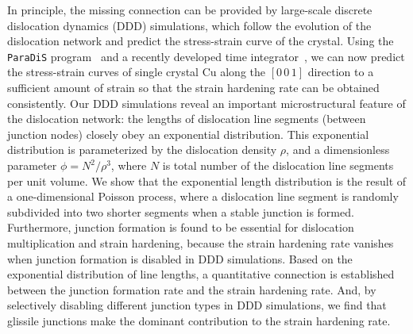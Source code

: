 \documentclass[%
reprint,
 amsmath,amssymb,
 aps,
superscriptaddress,
]{revtex4-1}
\begin{document}
In principle, the missing connection can be provided by large-scale discrete
dislocation dynamics (DDD) simulations, which follow the evolution of the
dislocation network and predict the stress-strain curve of the crystal.  
% 
Using the {\tt ParaDiS} program~\cite{Arsenlis2007,ParaDiS} and a recently
developed time integrator~\cite{Sills2016a}, we can now predict the
stress-strain curves of single crystal Cu along the $[0\,0\,1]$ direction to a
sufficient amount of strain so that the strain hardening rate can be obtained
consistently.
%
Our DDD simulations reveal an important microstructural feature of the
dislocation network: the lengths of dislocation line segments (between junction
nodes) closely obey an exponential distribution.
%
This exponential distribution is parameterized by the dislocation density
$\rho$, and a dimensionless parameter $\phi = N^2/ \rho^3$, where 
$N$ is total number of the dislocation line segments per unit volume.
%
We show that the exponential length distribution is the result of a
one-dimensional Poisson process, where a dislocation line segment is randomly
subdivided into two shorter segments when a stable junction is formed.
%
Furthermore, junction formation is found to be essential for dislocation multiplication and
strain hardening, because the strain hardening rate vanishes when
junction formation is disabled in DDD simulations.
%
Based on the exponential distribution of line lengths, a quantitative connection
is established between the junction formation rate and the strain hardening
rate.
%
And, by selectively disabling different junction types in DDD simulations, we find
that glissile junctions make the dominant contribution to the strain hardening
rate.
%
%


\end{document}
